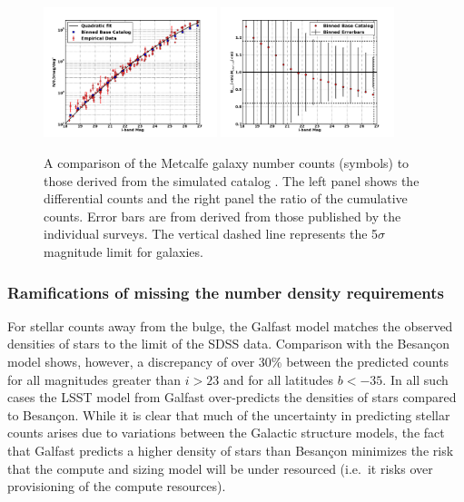 \documentclass[]{article}
\begin{document}
\begin{figure}[h]
\centering
\includegraphics[width=0.45\textwidth]{validation_figures/Ngals-i.png}
\hfil \includegraphics[width=0.45\textwidth]{validation_figures/CumulativeFraction_i.png}
\caption{A comparison of the Metcalfe galaxy number counts (symbols)
  to those derived from the simulated catalog \label{fig:gcounts}. The
  left panel shows the differential counts and the right panel the
  ratio of the cumulative counts. Error bars are from derived from
  those published by the individual surveys. \label{fig:gratio}
The vertical dashed line represents the
  5$\sigma$ magnitude limit for galaxies.}
\end{figure}

\subsubsection{Ramifications of missing the number density requirements}

For stellar counts away from the bulge, the Galfast model matches the
observed densities of stars to the limit of the SDSS data. Comparison
with the Besan\c{c}on model shows, however, a discrepancy of over 30\%
between the predicted counts for all magnitudes greater than $i>23$
and for all latitudes $b<-35$. In all such cases the LSST model from
Galfast over-predicts the densities of stars compared to
Besan\c{c}on. While it is clear that much of the uncertainty in
predicting stellar counts arises due to variations between the
Galactic structure models, the fact that Galfast predicts a higher
density of stars than Besan\c{c}on minimizes the risk that the compute
and sizing model will be under resourced (i.e.\ it risks over
provisioning of the compute resources).
\end{document}
